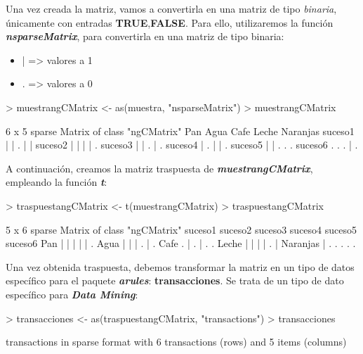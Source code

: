 \documentclass [a4paper] {article}
\begin{document}
Una vez creada la matriz, vamos a convertirla en una matriz de tipo \textit{binaria}, únicamente con entradas \textbf{TRUE},\textbf{FALSE}.
Para ello, utilizaremos la función \textbf{\textit{nsparseMatrix}}, para convertirla en una matriz de tipo binaria:
\begin{itemize}
    \item | => valores a 1
    \item . => valores a 0
\end{itemize}

\begin{Schunk}
\begin{Sinput}
> muestrangCMatrix <- as(muestra, "nsparseMatrix")
> muestrangCMatrix
\end{Sinput}
\begin{Soutput}
6 x 5 sparse Matrix of class "ngCMatrix"
        Pan Agua Cafe Leche Naranjas
suceso1   |    |    .     |        |
suceso2   |    |    |     |        .
suceso3   |    |    .     |        .
suceso4   |    .    |     |        .
suceso5   |    |    .     .        .
suceso6   .    .    .     |        .
\end{Soutput}
\end{Schunk}

A continuación, creamos la matriz traspuesta de \textbf{\textit{muestrangCMatrix}}, empleando la función \textbf{\textit{t}}:
\begin{Schunk}
\begin{Sinput}
> traspuestangCMatrix <- t(muestrangCMatrix)
> traspuestangCMatrix
\end{Sinput}
\begin{Soutput}
5 x 6 sparse Matrix of class "ngCMatrix"
         suceso1 suceso2 suceso3 suceso4 suceso5 suceso6
Pan            |       |       |       |       |       .
Agua           |       |       |       .       |       .
Cafe           .       |       .       |       .       .
Leche          |       |       |       |       .       |
Naranjas       |       .       .       .       .       .
\end{Soutput}
\end{Schunk}
\newpage
Una vez obtenida traspuesta, debemos transformar la matriz en un tipo de datos específico para el paquete \textbf{\textit{arules}}: \textbf{transacciones}.
Se trata de un tipo de dato específico para \textbf{\textit{Data Mining}}:
\begin{Schunk}
\begin{Sinput}
> transacciones  <- as(traspuestangCMatrix, "transactions")
> transacciones
\end{Sinput}
\begin{Soutput}
transactions in sparse format with
 6 transactions (rows) and
 5 items (columns)
\end{Soutput}
\end{Schunk}
\end{document}
